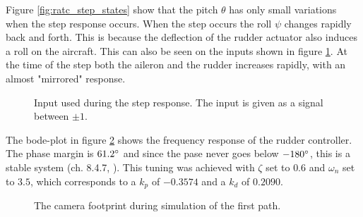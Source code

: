 Figure \ref{fig:ratc_step_states} show that the pitch $\theta$ has only small variations when the step response occurs. When the step occurs the roll $\psi$ changes rapidly back and forth. This is because the deflection of the rudder actuator also induces a roll on the aircraft. This can also be seen on the inputs shown in figure \ref{fig:ratc_step_input}. At the time of the step both the aileron and the rudder increases rapidly, with an almost "mirrored" response.

\begin{figure}[]
    \centering
    \caption{Input used during the step response. The input is given as a signal between $\pm1$.}
	\label{fig:ratc_step_input}
\end{figure}

The bode-plot in figure \ref{fig:ratc_bode} shows the frequency response of the rudder controller. The phase margin is $61.2\degree$ and since the pase never goes below $-180\degree$, this is a stable system (ch. 8.4.7, \cite{regBALCHEN}). This tuning was achieved with $\zeta$ set to $0.6$ and $\omega_n$ set to $3.5$, which corresponds to a $k_p$ of $-0.3574$ and a $k_d$ of $0.2090$.

\begin{figure}[]
    \centering
    \caption{The camera footprint during simulation of the first path.}
	\label{fig:ratc_bode}
\end{figure}


